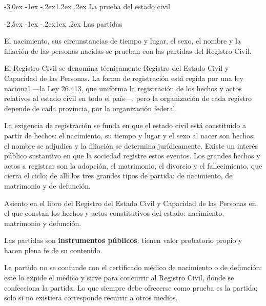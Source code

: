\documentclass[12pt,oneside]{book}
\makeatletter
\renewcommand\section{\@startsection{section}{1}{\z@}%
  {-3.0ex \@plus -1ex \@minus -.2ex}{1.2ex \@plus .2ex}%
  {\normalfont\large\bfseries\color{acento}}}
\renewcommand\subsection{\@startsection{subsection}{2}{\z@}%
  {-2.5ex \@plus -1ex \@minus -.2ex}{1ex \@plus .2ex}%
  {\normalfont\normalsize\bfseries}}
\makeatother
\begin{document}
\section{La prueba del estado civil}

\subsection{Las partidas}

\begin{regla}
El nacimiento, sus circunstancias de tiempo y lugar, el sexo, el nombre y la filiación de las personas nacidas se prueban con las partidas del Registro Civil.
\end{regla}

El Registro Civil se denomina técnicamente Registro del Estado Civil y Capacidad de las Personas. La forma de registración está regida por una ley nacional ---la Ley 26.413, que uniforma la registración de los hechos y actos relativos al estado civil en todo el país---, pero la organización de cada registro depende de cada provincia, por la organización federal.

La exigencia de registración se funda en que el estado civil está constituido a partir de hechos: el nacimiento, su tiempo y lugar y el sexo al nacer son hechos; el nombre se adjudica y la filiación se determina jurídicamente. Existe un interés público sustantivo en que la sociedad registre estos eventos. Los grandes hechos y actos a registrar son la adopción, el matrimonio, el divorcio y el fallecimiento, que cierra el ciclo; de allí los tres grandes tipos de partida: de nacimiento, de matrimonio y de defunción.

\begin{definicion}[Partida]
Asiento en el libro del Registro del Estado Civil y Capacidad de las Personas en el que constan los hechos y actos constitutivos del estado: nacimiento, matrimonio y defunción.
\end{definicion}

\begin{importante}
Las partidas son \textbf{instrumentos públicos}: tienen valor probatorio propio y hacen plena fe de su contenido.
\end{importante}

\begin{nota}
La partida no se confunde con el certificado médico de nacimiento o de defunción: este lo expide el médico y sirve para concurrir al Registro Civil, donde se confecciona la partida. Lo que siempre debe ofrecerse como prueba es la partida; solo si no existiera corresponde recurrir a otros medios.
\end{nota}
\end{document}
